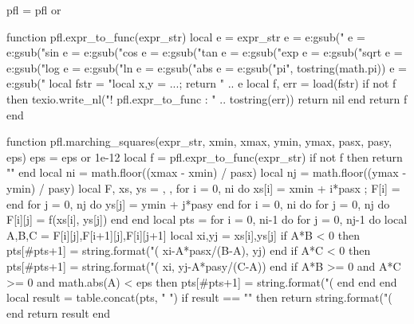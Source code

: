 \begin{luacode*}
pfl = pfl or {}

function pfl.expr_to_func(expr_str)
    local e = expr_str
    e = e:gsub("%
    e = e:gsub("sin%
    e = e:gsub("cos%
    e = e:gsub("tan%
    e = e:gsub("exp%
    e = e:gsub("sqrt%
    e = e:gsub("log%
    e = e:gsub("ln%
    e = e:gsub("abs%
    e = e:gsub("pi",    tostring(math.pi))
    e = e:gsub("%
    local fstr = "local x,y = ...; return " .. e
    local f, err = load(fstr)
    if not f then
        texio.write_nl("! pfl.expr_to_func : " .. tostring(err))
        return nil
    end
    return f
end

function pfl.marching_squares(expr_str, xmin, xmax, ymin, ymax, pasx, pasy, eps)
    eps = eps or 1e-12
    local f = pfl.expr_to_func(expr_str)
    if not f then return "" end
    local ni = math.floor((xmax - xmin) / pasx)
    local nj = math.floor((ymax - ymin) / pasy)
    local F, xs, ys = {}, {}, {}
    for i = 0, ni do xs[i] = xmin + i*pasx ; F[i] = {} end
    for j = 0, nj do ys[j] = ymin + j*pasy end
    for i = 0, ni do
        for j = 0, nj do F[i][j] = f(xs[i], ys[j]) end
    end
    local pts = {}
    for i = 0, ni-1 do
        for j = 0, nj-1 do
            local A,B,C = F[i][j],F[i+1][j],F[i][j+1]
            local xi,yj = xs[i],ys[j]
            if A*B < 0 then
                pts[#pts+1] = string.format("(%
                    xi-A*pasx/(B-A), yj)
            end
            if A*C < 0 then
                pts[#pts+1] = string.format("(%
                    xi, yj-A*pasy/(C-A))
            end
            if A*B >= 0 and A*C >= 0 and math.abs(A) < eps then
                pts[#pts+1] = string.format("(%
            end
        end
    end
    local result = table.concat(pts, " ")
    if result == "" then
        return string.format("(%
    end
    return result
end


\end{luacode*}
